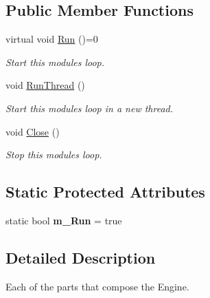 \subsection*{Public Member Functions}
\begin{DoxyCompactItemize}
\item 
virtual void \hyperlink{classTarbora_1_1AbstractModule_abc4de331276ff78b18efafe14498bf21}{Run} ()=0
\begin{DoxyCompactList}\small\item\em Start this module\textquotesingle{}s loop. \end{DoxyCompactList}\item 
\mbox{\label{classTarbora_1_1AbstractModule_a2d5baaab3f030968e4ed352b43b155e7}} 
void \hyperlink{classTarbora_1_1AbstractModule_a2d5baaab3f030968e4ed352b43b155e7}{Run\+Thread} ()
\begin{DoxyCompactList}\small\item\em Start this module\textquotesingle{}s loop in a new thread. \end{DoxyCompactList}\item 
\mbox{\label{classTarbora_1_1AbstractModule_ade3cdb52217ae0fce50b0ed085b7efb7}} 
void \hyperlink{classTarbora_1_1AbstractModule_ade3cdb52217ae0fce50b0ed085b7efb7}{Close} ()
\begin{DoxyCompactList}\small\item\em Stop this module\textquotesingle{}s loop. \end{DoxyCompactList}\end{DoxyCompactItemize}
\subsection*{Static Protected Attributes}
\begin{DoxyCompactItemize}
\item 
\mbox{\label{classTarbora_1_1AbstractModule_ae0b9893d8b8fa1f0cc4a15f7a50ba185}} 
static bool {\bfseries m\+\_\+\+Run} = true
\end{DoxyCompactItemize}


\subsection{Detailed Description}
Each of the parts that compose the Engine. 

